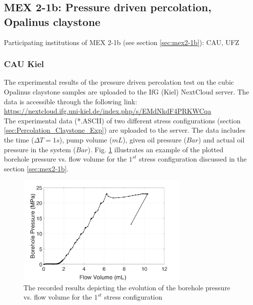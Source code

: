 \subsection{MEX 2-1b: Pressure driven percolation, Opalinus claystone}

Participating institutions of MEX 2-1b (see section \ref{sec:mex2-1b}): CAU, UFZ

\subsubsection*{CAU Kiel}

The experimental results of the pressure driven percolation test on the cubic Opalinus claystone samples are uploaded to the IfG (Kiel) NextCloud server. The data is accessible through the following link:\\
\hyperlink{https://nextcloud.ifg.uni-kiel.de/index.php/s/EMdNkdF4PRKWCqa}{https://nextcloud.ifg.uni-kiel.de/index.php/s/EMdNkdF4PRKWCqa}\\

The experimental data (*.ASCII) of two different stress configurations (section \ref{sec:Percolation_Claystone_Exp}) are uploaded to the server. The data includes the time ($\Delta T=1s$), pump volume ($mL$), given oil pressure ($Bar$) and actual oil pressure in the system ($Bar$). Fig. \ref{fig:Amir_Percolation_Flow_a_Data}
illustrates an example of the plotted borehole pressure vs. flow volume for the $1^{st}$ stress configuration discussed in the section \ref{sec:mex2-1b}.

\begin{figure}[!ht]
\centering
\includegraphics[width=0.75\textwidth]{figures/Amir_Percolation_Flow_a_Data.png}
\caption{The recorded results depicting the evolution of the borehole pressure vs. flow volume for the $1^{st}$ stress configuration}
\label{fig:Amir_Percolation_Flow_a_Data}
\end{figure}

